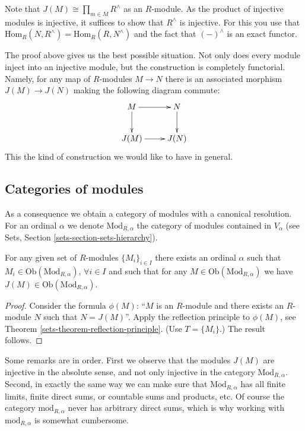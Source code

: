 \smallskip\noindent
Note that $J(M) \cong \prod_{m\in M} R^\wedge$ as an $R$-module.
As the product of injective modules is injective, it suffices to
show that $R^\wedge$ is injective. For this you use that 
$\text{Hom}_R(N, R^\wedge) = \text{Hom}_R(R, N^\wedge)$ and the
fact that $(-)^\wedge$ is an exact functor.

\smallskip\noindent
The proof above gives us the best possible situation. Not only does
every module inject into an injective module, but the construction is
completely functorial. Namely, for any map of $R$-modules $M \to N$ 
there is an associated morphism $J(M) \to J(N)$ making the following 
diagram commute:
$$
\xymatrix{
M \ar[d] \ar[r] & N \ar[d] \\
J(M) \ar[r] & J(N) }
$$
This the kind of construction we would like to have in general.

\subsection{Categories of modules}
\label{subsection-category-modules}

\noindent
As a consequence we obtain a category of modules with a canonical
resolution. For an ordinal $\alpha$ we denote $\text{Mod}_{R,\alpha}$
the category of modules contained in $V_\alpha$ (see Sets, 
Section \ref{sets-section-sets-hierarchy}).

\begin{lemma}
\label{lemma-injective-module-preserves-category}
For any given set of $R$-modules $\{M_i\}_{i\in I}$ there exists an ordinal
$\alpha$ such that $M_i \in \text{Ob}(\text{Mod}_{R,\alpha})$,
$\forall i\in I$ and such that for any
$M \in \text{Ob}(\text{Mod}_{R,\alpha})$ we have
$J(M) \in \text{Ob}(\text{Mod}_{R,\alpha})$.
\end{lemma}

\begin{proof}
Consider the formula $\phi(M)$: ``$M$ is an $R$-module and there exists
an $R$-module $N$ such that $N=J(M)$''. Apply the reflection principle to
$\phi(M)$, see  Theorem \ref{sets-theorem-reflection-principle}. (Use $T = \{M_i\}$.)
The result follows.
\end{proof}

\noindent
Some remarks are in order. First we observe that the modules $J(M)$
are injective in the absolute sense, and not only injective in the
category $\text{Mod}_{R,\alpha}$. Second, in exactly the same way we
can make sure that $\text{Mod}_{R,\alpha}$ has all finite limits,
finite direct sums, or countable sums and products, etc. Of course
the category $\text{mod}_{R,\alpha}$ never has arbitrary direct sums,
which is why working with $\text{mod}_{R,\alpha}$ is somewhat cumbersome.

